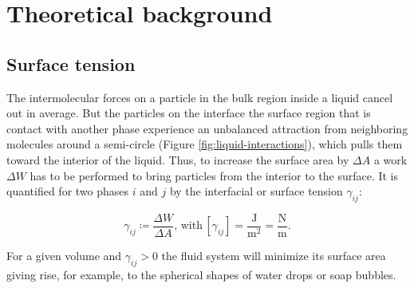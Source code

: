\section{Theoretical background}

\subsection{Surface tension}

The intermolecular forces on a particle in the bulk region inside
a liquid cancel out in average. But the particles on the interface
\textendash{} the surface region that is contact with another phase
\textendash{} experience an unbalanced attraction from neighboring
molecules around a semi-circle (Figure \ref{fig:liquid-interactions}),
which pulls them toward the interior of the liquid. Thus, to increase
the surface area by $\Delta A$ a work $\varDelta W$ has to be performed
to bring particles from the interior to the surface. It is quantified
for two phases $i$ and $j$ by the interfacial or surface tension
$\gamma_{ij}$:

\[

\gamma_{ij}\coloneqq\frac{\varDelta W}{\varDelta A}\mathrm{,}\,\mathrm{with}\,[\gamma_{ij}]=\frac{\mathrm{J}}{\mathrm{m}^{2}}=\mathrm{\frac{N}{m}}.

\]

For a given volume and $\gamma_{ij}>0$ the fluid system will minimize
its surface area giving rise, for example, to the spherical shapes
of water drops or soap bubbles.